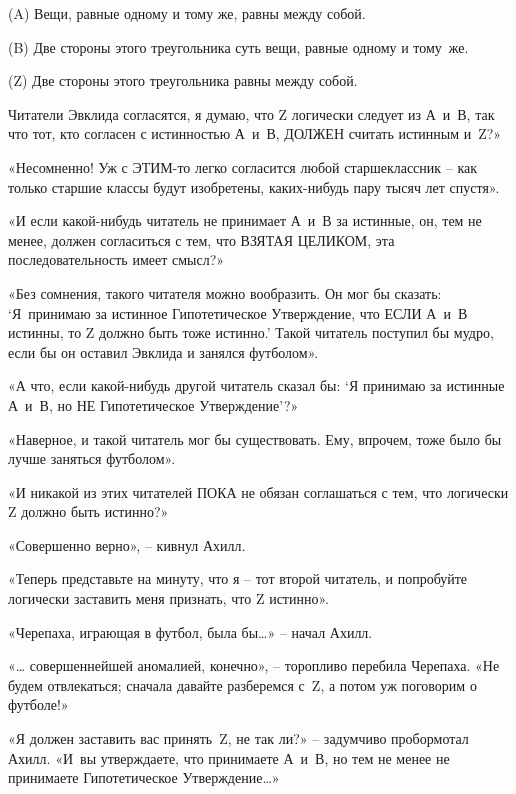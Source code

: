 \documentclass[../main.tex]{subfiles}
\begin{document}
\begin{statements}
    \item[(A)] Вещи, равные одному и тому же, равны между собой.
    \item[(B)] Две стороны этого треугольника суть вещи, равные одному и тому~же.
    \item[(Z)] Две стороны этого треугольника равны между собой.
\end{statements}

Читатели Эвклида согласятся, я думаю, что Z логически следует из А~и~В, так что тот, кто согласен с истинностью А~и~В, ДОЛЖЕН считать истинным и~Z?»

«Несомненно! Уж с ЭТИМ-то легко согласится любой старшеклассник \--- как только старшие классы будут изобретены, каких-нибудь пару тысяч лет спустя».

«И если какой-нибудь читатель не принимает А~и~В за истинные, он, тем не менее, должен согласиться с тем, что ВЗЯТАЯ ЦЕЛИКОМ, эта последовательность имеет смысл?»

«Без сомнения, такого читателя можно вообразить. Он мог бы сказать: \enquote*{Я~принимаю за истинное Гипотетическое Утверждение, что ЕСЛИ А~и~В истинны, то Z должно быть тоже истинно.} Такой читатель поступил бы мудро, если бы он оставил Эвклида и занялся футболом».

«А что, если какой-нибудь другой читатель сказал бы: \enquote*{Я принимаю за истинные А~и~В, но НЕ Гипотетическое Утверждение}?»

«Наверное, и такой читатель мог бы существовать. Ему, впрочем, тоже было бы лучше заняться футболом».

«И никакой из этих читателей ПОКА не обязан соглашаться с тем, что логически Z должно быть истинно?»

«Совершенно верно», \--- кивнул Ахилл.

«Теперь представьте на минуту, что я \--- тот второй читатель, и попробуйте логически заставить меня признать, что Z истинно».

«Черепаха, играющая в футбол, была бы\ldots» \--- начал Ахилл.

«\ldots{} совершеннейшей аномалией, конечно», \--- торопливо перебила Черепаха. «Не будем отвлекаться; сначала давайте разберемся с~Z, а потом уж поговорим о футболе!»

«Я должен заставить вас принять~Z, не так ли?» \--- задумчиво пробормотал Ахилл. «И~вы утверждаете, что принимаете А~и~В, но тем не менее не принимаете Гипотетическое Утверждение\ldots»
\end{document}

